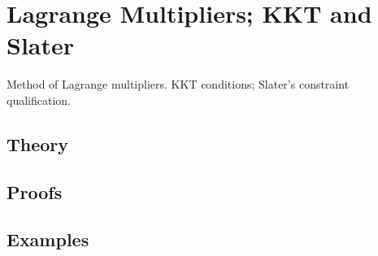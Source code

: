
\section{Lagrange Multipliers; KKT and Slater}
\label{sec:2.4.16-lagrange-multipliers}

\begin{ticket}
Method of Lagrange multipliers. KKT conditions; Slater's constraint qualification.
\end{ticket}

\subsection*{Theory}

\subsection*{Proofs}

\subsection*{Examples}
